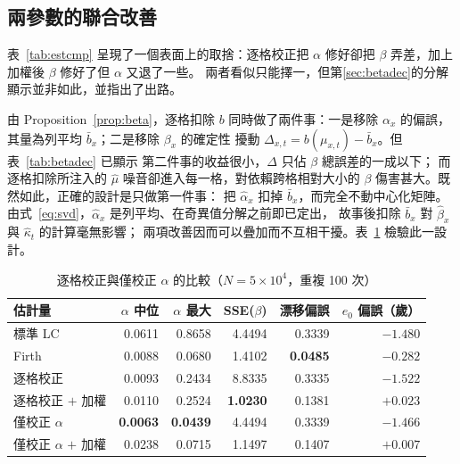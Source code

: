 \documentclass[UTF8, fontset=macnew, a4paper, 12pt]{ctexart}
\begin{document}
\subsection{兩參數的聯合改善}\label{sec:joint}

表~\ref{tab:estcmp} 呈現了一個表面上的取捨：逐格校正把 $\alpha$ 修好卻把
$\beta$ 弄差，加上加權後 $\beta$ 修好了但 $\alpha$ 又退了一些。
兩者看似只能擇一，但第\ref{sec:betadec}的分解顯示並非如此，並指出了出路。

由 Proposition~\ref{prop:beta}，逐格扣除 $b$ 同時做了兩件事：一是移除
$\alpha_x$ 的偏誤，其量為列平均 $\bar b_x$；二是移除 $\beta_x$ 的確定性
擾動 $\Delta_{x,t}=b(\mu_{x,t})-\bar b_x$。但表~\ref{tab:betadec} 已顯示
第二件事的收益很小，$\Delta$ 只佔 $\beta$ 總誤差的一成以下；
而逐格扣除所注入的 $\hat\mu$ 噪音卻進入每一格，對依賴跨格相對大小的
$\beta$ 傷害甚大。既然如此，正確的設計是只做第一件事：
把 $\hat\alpha_x$ 扣掉 $\bar b_x$，而完全不動中心化矩陣。
由式~\eqref{eq:svd}，$\hat\alpha_x$ 是列平均、在奇異值分解之前即已定出，
故事後扣除 $\bar b_x$ 對 $\hat\beta_x$ 與 $\hat\kappa_t$ 的計算毫無影響；
兩項改善因而可以疊加而不互相干擾。表~\ref{tab:joint} 檢驗此一設計。

\begin{table}[H]
\centering
\caption{逐格校正與僅校正 $\alpha$ 的比較（$N=5\times10^4$，重複 100 次）}
\small
\begin{tabular}{lrrrrr}
\toprule
估計量 & $\alpha$ 中位 & $\alpha$ 最大 & SSE($\beta$) & 漂移偏誤 & $e_0$ 偏誤（歲）\\
\midrule
標準 LC              & 0.0611 & 0.8658 & 4.4494 & 0.3339 & $-1.480$\\
Firth                & 0.0088 & 0.0680 & 1.4102 & \textbf{0.0485} & $-0.282$\\
逐格校正             & 0.0093 & 0.2434 & 8.8335 & 0.3335 & $-1.522$\\
逐格校正 $+$ 加權     & 0.0110 & 0.2524 & \textbf{1.0230} & 0.1381 & $+0.023$\\
僅校正 $\alpha$      & \textbf{0.0063} & \textbf{0.0439} & 4.4494 & 0.3339 & $-1.466$\\
僅校正 $\alpha$ $+$ 加權 & 0.0238 & 0.0715 & 1.1497 & 0.1407 & \textbf{$+0.007$}\\
\bottomrule
\end{tabular}
\label{tab:joint}
\end{table}
\end{document}

